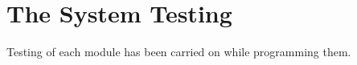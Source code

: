 \chapter{\label{chapter6} The System Testing}

Testing of each module has been carried on while programming them. 